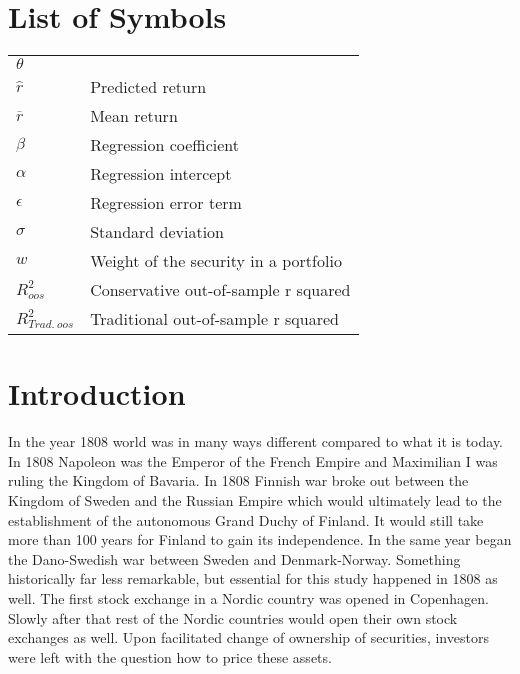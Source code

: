 \documentclass[12pt]{article}
\begin{document}
\section*{List of Symbols}
\begin{tabular}{l l}
$\theta$ & \\
$\hat{r}$ & Predicted return\\
$\overline{r}$ & Mean return\\
$\beta$ & Regression coefficient \\
$\alpha$ & Regression intercept\\
$\epsilon$ & Regression error term\\
$\sigma$ & Standard deviation\\
$w$ & Weight of the security in a portfolio\\
$R^2_{oos}$ & Conservative out-of-sample r squared \\
$R^2_{Trad. \ oos}$ & Traditional out-of-sample r squared \\
\end{tabular}

\newpage

\section{Introduction} \label{Introduction}
In the year 1808 world was in many ways different compared to what it is today. In 1808 Napoleon was the Emperor of the French Empire and Maximilian I was ruling the Kingdom of Bavaria. In 1808 Finnish war broke out between the Kingdom of Sweden and the Russian Empire which would ultimately lead to the establishment of the autonomous Grand Duchy of Finland. It would still take more than 100 years for Finland to gain its independence. In the same year began the Dano-Swedish war between Sweden and Denmark-Norway. Something historically far less remarkable, but essential for this study happened in 1808 as well. The first stock exchange in a Nordic country was opened in Copenhagen\footnotemark. Slowly after that rest of the Nordic countries would open their own stock exchanges as well. Upon facilitated change of ownership of securities, investors were left with the question how to price these assets. \par

\end{document}
